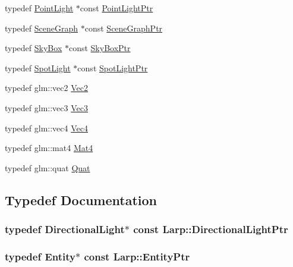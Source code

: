 \begin{DoxyCompactItemize}
\item 
typedef \hyperlink{structLarp_1_1PointLight}{Point\+Light} $\ast$const \hyperlink{namespaceLarp_a07215808e8e3c5229ca8549c5450e3e5}{Point\+Light\+Ptr}
\item 
typedef \hyperlink{classLarp_1_1SceneGraph}{Scene\+Graph} $\ast$const \hyperlink{namespaceLarp_acf02d81e4b52238dcd17cb6249eadadc}{Scene\+Graph\+Ptr}
\item 
typedef \hyperlink{classLarp_1_1SkyBox}{Sky\+Box} $\ast$const \hyperlink{namespaceLarp_a09c73976019d9e892b1b3c995d9a9430}{Sky\+Box\+Ptr}
\item 
typedef \hyperlink{structLarp_1_1SpotLight}{Spot\+Light} $\ast$const \hyperlink{namespaceLarp_a5366be98946441fcea9b8a155bc52d95}{Spot\+Light\+Ptr}
\item 
typedef glm\+::vec2 \hyperlink{namespaceLarp_ad25d627b744435e2a62f84fce6db89a6}{Vec2}
\item 
typedef glm\+::vec3 \hyperlink{namespaceLarp_a477b379311661e072acd751be3d473aa}{Vec3}
\item 
typedef glm\+::vec4 \hyperlink{namespaceLarp_a516c3e9937a8bc59ccc93698bad0dc2c}{Vec4}
\item 
typedef glm\+::mat4 \hyperlink{namespaceLarp_af9602e8b75abbefde183900a720429f6}{Mat4}
\item 
typedef glm\+::quat \hyperlink{namespaceLarp_a24b78f83da1be54c0645d80ca4f47b39}{Quat}
\end{DoxyCompactItemize}


\subsection{Typedef Documentation}
\subsubsection[{\texorpdfstring{Directional\+Light\+Ptr}{DirectionalLightPtr}}]{\setlength{\rightskip}{0pt plus 5cm}typedef {\bf Directional\+Light}$\ast$ const {\bf Larp\+::\+Directional\+Light\+Ptr}}\hypertarget{namespaceLarp_a38725e08be7b2ebb94f5f71eb0f0c692}{}\label{namespaceLarp_a38725e08be7b2ebb94f5f71eb0f0c692}
\subsubsection[{\texorpdfstring{Entity\+Ptr}{EntityPtr}}]{\setlength{\rightskip}{0pt plus 5cm}typedef {\bf Entity}$\ast$ const {\bf Larp\+::\+Entity\+Ptr}}\hypertarget{namespaceLarp_a775efcc4cabb308d50168c52df343353}{}\label{namespaceLarp_a775efcc4cabb308d50168c52df343353}
